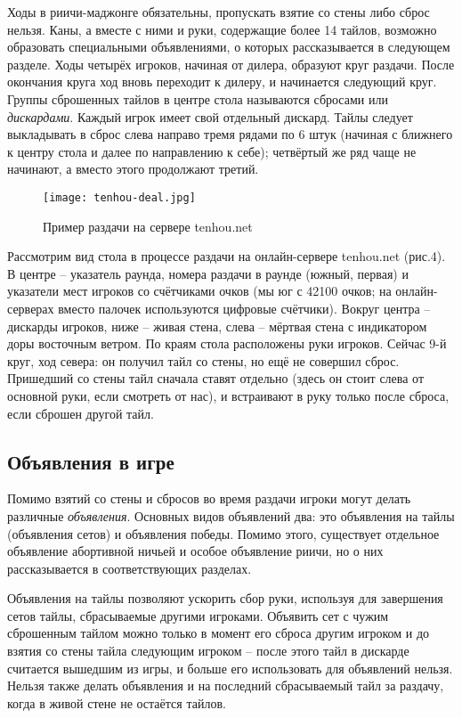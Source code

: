 Ходы в риичи-маджонге обязательны, пропускать взятие со стены либо сброс нельзя. Каны, а вместе с ними и руки, содержащие более 14 тайлов, возможно образовать специальными объявлениями, о которых рассказывается в следующем разделе. Ходы четырёх игроков, начиная от дилера, образуют круг раздачи. После окончания круга ход вновь переходит к дилеру, и начинается следующий круг. Группы сброшенных тайлов в центре стола называются сбросами или \textit{дискардами}. Каждый игрок имеет свой отдельный дискард. Тайлы следует выкладывать в сброс слева направо тремя рядами по 6 штук (начиная с ближнего к центру стола и далее по направлению к себе); четвёртый же ряд чаще не начинают, а вместо этого продолжают третий.

\begin{figure}[H]
	\centering
	\texttt{[image: tenhou-deal.jpg]}
	\caption{Пример раздачи на сервере tenhou.net}
\end{figure}

Рассмотрим вид стола в процессе раздачи на онлайн-сервере tenhou.net (рис.4). В центре – указатель раунда, номера раздачи в раунде (южный, первая) и указатели мест игроков со счётчиками очков (мы юг с 42100 очков; на онлайн-серверах вместо палочек используются цифровые счётчики). Вокруг центра – дискарды игроков, ниже – живая стена, слева – мёртвая стена с индикатором доры восточным ветром. По краям стола расположены руки игроков. Сейчас 9-й круг, ход севера: он получил тайл со стены, но ещё не совершил сброс. Пришедший со стены тайл сначала ставят отдельно (здесь он стоит слева от основной руки, если смотреть от нас), и встраивают в руку только после сброса, если сброшен другой тайл.

\subsection{Объявления в игре}

Помимо взятий со стены и сбросов во время раздачи игроки могут делать различные \textit{объявления}. Основных видов объявлений два: это объявления на тайлы (объявления сетов) и объявления победы. Помимо этого, существует отдельное объявление абортивной ничьей и особое объявление риичи, но о них рассказывается в соответствующих разделах.

Объявления на тайлы позволяют ускорить сбор руки, используя для завершения сетов тайлы, сбрасываемые другими игроками. Объявить сет с чужим сброшенным тайлом можно только в момент его сброса другим игроком и до взятия со стены тайла следующим игроком – после этого тайл в дискарде считается вышедшим из игры, и больше его использовать для объявлений нельзя. Нельзя также делать объявления и на последний сбрасываемый тайл за раздачу, когда в живой стене не остаётся тайлов. 

